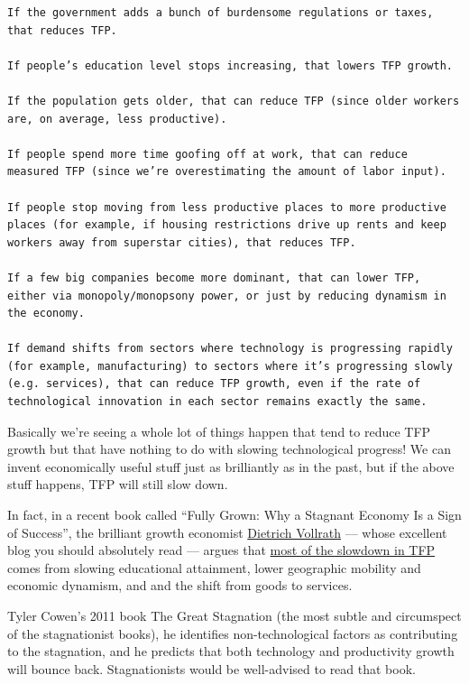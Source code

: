 \documentclass[
]{book}
\begin{document}
\begin{verbatim}
If the government adds a bunch of burdensome regulations or taxes, that reduces TFP.

If people’s education level stops increasing, that lowers TFP growth.

If the population gets older, that can reduce TFP (since older workers are, on average, less productive).

If people spend more time goofing off at work, that can reduce measured TFP (since we’re overestimating the amount of labor input).

If people stop moving from less productive places to more productive places (for example, if housing restrictions drive up rents and keep workers away from superstar cities), that reduces TFP.

If a few big companies become more dominant, that can lower TFP, either via monopoly/monopsony power, or just by reducing dynamism in the economy.

If demand shifts from sectors where technology is progressing rapidly (for example, manufacturing) to sectors where it’s progressing slowly (e.g. services), that can reduce TFP growth, even if the rate of technological innovation in each sector remains exactly the same.
\end{verbatim}

Basically we're seeing a whole lot of things happen that tend to reduce TFP growth but that have nothing to do with slowing technological progress! We can invent economically useful stuff just as brilliantly as in the past, but if the above stuff happens, TFP will still slow down.

In fact, in a recent book called ``Fully Grown: Why a Stagnant Economy Is a Sign of Success'', the brilliant growth economist \href{https://growthecon.com/blog/}{Dietrich Vollrath} --- whose excellent blog you should absolutely read --- argues that \href{https://medium.com/@mattclancy/fully-grown-a-review-a55719c6049c}{most of the slowdown in TFP} comes from slowing educational attainment, lower geographic mobility and economic dynamism, and and the shift from goods to services.

Tyler Cowen's 2011 book The Great Stagnation (the most subtle and circumspect of the stagnationist books), he identifies non-technological factors as contributing to the stagnation, and he predicts that both technology and productivity growth will bounce back. Stagnationists would be well-advised to read that book.
\end{document}
